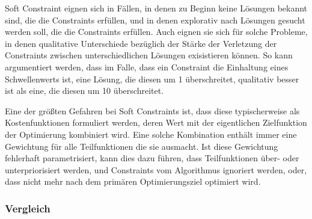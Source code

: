 Soft Constraint eignen sich in Fällen, in denen zu Beginn keine Lösungen bekannt sind, die die Constraints erfüllen, und in denen explorativ nach Lösungen gesucht werden soll, die die Constraints erfüllen.
Auch eignen sie sich für solche Probleme, in denen qualitative Unterschiede bezüglich der Stärke der Verletzung der Constraints zwischen unterschiedlichen Lösungen exisistieren können.
So kann argumentiert werden, dass im Falle, dass ein Constraint die Einhaltung eines Schwellenwerts ist, eine Lösung, die diesen um 1 überschreitet, qualitativ besser ist als eine, die diesen um 10 überschreitet.

Eine der größten Gefahren bei Soft Constraints ist, dass diese typischerweise als Kostenfunktionen formuliert werden, deren Wert mit der eigentlichen Zielfunktion der Optimierung kombiniert wird.
Eine solche Kombination enthält immer eine Gewichtung für alle Teilfunktionen die sie ausmacht.
Ist diese Gewichtung fehlerhaft parametrisiert, kann dies dazu führen, dass Teilfunktionen über- oder unterpriorisiert werden, und Constraints vom Algorithmus ignoriert werden, oder, dass nicht mehr nach dem primären Optimierungsziel optimiert wird.

\subsubsection{Vergleich}

